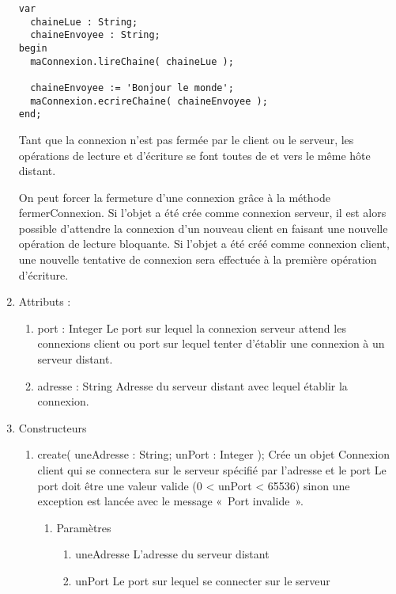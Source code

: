 \documentclass[12pt,pdftex,oneside]{uqam_these}
\begin{document}
\begin{enumerate}
\begin{verbatim}
var
  chaineLue : String;
  chaineEnvoyee : String;
begin
  maConnexion.lireChaine( chaineLue );

  chaineEnvoyee := 'Bonjour le monde';
  maConnexion.ecrireChaine( chaineEnvoyee );
end;

\end{verbatim}

Tant que la connexion n'est pas fermée par le client ou le serveur,
les opérations de lecture et d'écriture se font toutes de et vers le
même hôte distant.

On peut forcer la fermeture d'une connexion grâce à la méthode
fermerConnexion. Si l'objet a été crée comme connexion serveur, il est
alors possible d'attendre la connexion d'un nouveau client en faisant
une nouvelle opération de lecture bloquante. Si l'objet a été créé
comme connexion client, une nouvelle tentative de connexion sera
effectuée à la première opération d'écriture.


\item Attributs :
  \begin{enumerate}
    
  \item port : Integer
        Le port sur lequel la connexion serveur attend les connexions client
        ou port sur lequel tenter d'établir une connexion à un serveur
        distant.

  \item adresse : String 
        Adresse du serveur distant avec lequel établir la connexion.
  \end{enumerate}

\item Constructeurs
  \begin{enumerate}
  \item create( uneAdresse : String; unPort : Integer );
        Crée un objet Connexion client qui se connectera sur le serveur spécifié par l'adresse et le port
        Le port doit être une valeur valide (0 < unPort < 65536) sinon une
        exception est lancée avec le message «~Port invalide~».
        \begin{enumerate}
        \item Paramètres
          \begin{enumerate}
          \item uneAdresse
                L'adresse du serveur distant
          \item unPort
                Le port sur lequel se connecter sur le serveur
          \end{enumerate}
        \end{enumerate}


\end{enumerate}
\end{enumerate}
\end{document}
